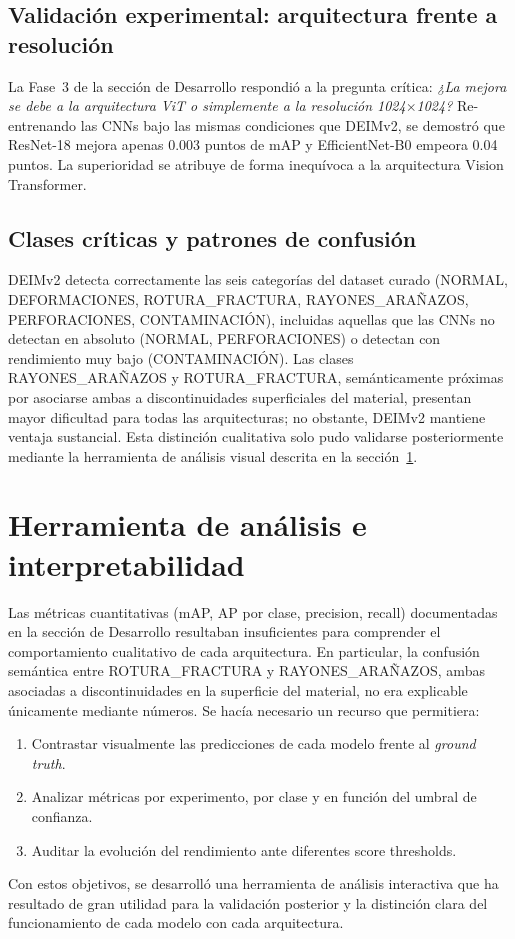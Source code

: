 \subsection{Validación experimental: arquitectura frente a resolución}

La Fase~3 de la sección de Desarrollo respondió a la pregunta crítica: \textit{¿La mejora se debe a la arquitectura \acrshort{ViT} o simplemente a la resolución 1024$\times$1024?} Re-entrenando las CNNs bajo las mismas condiciones que DEIMv2, se demostró que ResNet-18 mejora apenas 0.003 puntos de mAP y EfficientNet-B0 empeora 0.04 puntos. La superioridad se atribuye de forma inequívoca a la arquitectura Vision Transformer.

\subsection{Clases críticas y patrones de confusión}

DEIMv2 detecta correctamente las seis categorías del dataset curado (NORMAL, DEFORMACIONES, \mbox{ROTURA\_FRACTURA}, \mbox{RAYONES\_ARAÑAZOS}, PERFORACIONES, CONTAMINACIÓN), incluidas aquellas que las CNNs no detectan en absoluto (NORMAL, PERFORACIONES) o detectan con rendimiento muy bajo (CONTAMINACIÓN). Las clases \mbox{RAYONES\_ARAÑAZOS} y \mbox{ROTURA\_FRACTURA}, semánticamente próximas por asociarse ambas a discontinuidades superficiales del material, presentan mayor dificultad para todas las arquitecturas; no obstante, DEIMv2 mantiene ventaja sustancial. Esta distinción cualitativa solo pudo validarse posteriormente mediante la herramienta de análisis visual descrita en la sección~\ref{sec:herramienta_analisis}.


\section{Herramienta de análisis e interpretabilidad}
\label{sec:herramienta_analisis}

Las métricas cuantitativas (mAP, AP por clase, precision, recall) documentadas en la sección de Desarrollo resultaban insuficientes para comprender el comportamiento cualitativo de cada arquitectura. En particular, la confusión semántica entre \mbox{ROTURA\_FRACTURA} y \mbox{RAYONES\_ARAÑAZOS}, ambas asociadas a discontinuidades en la superficie del material, no era explicable únicamente mediante números. Se hacía necesario un recurso que permitiera:
\begin{enumerate}
    \item Contrastar visualmente las predicciones de cada modelo frente al \textit{ground truth}.
    \item Analizar métricas por experimento, por clase y en función del umbral de confianza.
    \item Auditar la evolución del rendimiento ante diferentes score thresholds.
\end{enumerate}
Con estos objetivos, se desarrolló una herramienta de análisis interactiva que ha resultado de gran utilidad para la validación posterior y la distinción clara del funcionamiento de cada modelo con cada arquitectura.


